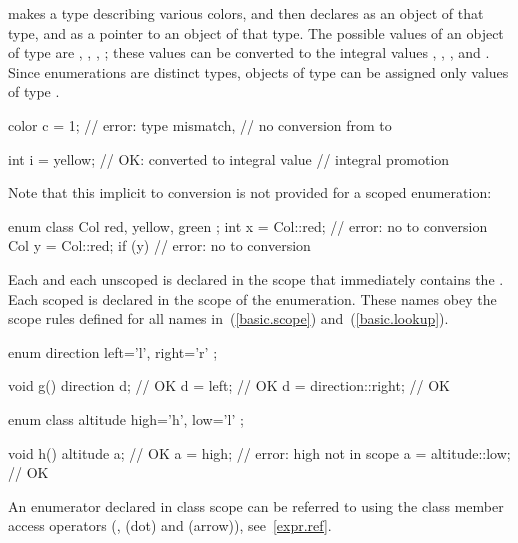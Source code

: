 makes  a type describing various colors, and then declares
 as an object of that type, and  as a pointer to an
object of that type. The possible values of an object of type
 are , , ,
; these values can be converted to the integral values
, , , and . Since enumerations are
distinct types, objects of type  can be assigned only
values of type .

\begin{codeblock}
color c = 1;                    // error: type mismatch,
                                // no conversion from  to 

int i = yellow;                 // OK:  converted to integral value 
                                // integral promotion
\end{codeblock}

Note that this implicit  to 
conversion is not provided for a scoped enumeration:

\begin{codeblock}
enum class Col { red, yellow, green };
int x = Col::red;               // error: no  to  conversion
Col y = Col::red;
if (y) { }                      // error: no  to  conversion
\end{codeblock}

\exitexample

\pnum
{}%
Each  and each unscoped  is
declared in the scope that immediately contains the .
Each scoped  is declared in the scope of the
enumeration.
These names obey the scope rules defined for all names
in~(\ref{basic.scope}) and~(\ref{basic.lookup}).\enterexample

\begin{codeblock}
enum direction { left='l', right='r' }; 

void g()  { 
  direction d;                  // OK 
  d = left;                     // OK 
  d = direction::right;         // OK 
} 

enum class altitude { high='h', low='l' }; 

void h()  { 
  altitude a;                   // OK 
  a = high;                     // error: high not in scope 
  a = altitude::low;            // OK 
}
\end{codeblock}
\exitexample
{}%
An enumerator declared in class scope can be referred to using the class
member access operators (\tcode{::},  (dot) and \tcode{->}
(arrow)), see~\ref{expr.ref}.
\enterexample

